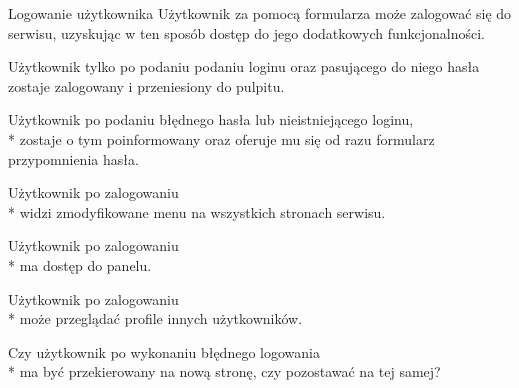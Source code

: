 \documentclass[a4paper]{article}
\begin{document}
    \begin{userstory}{Logowanie użytkownika}
        Użytkownik za pomocą formularza może zalogować się do serwisu,
        uzyskując w ten sposób dostęp do jego dodatkowych funkcjonalności.
        
        \begin{tests}
            \item{
                Użytkownik tylko po podaniu podaniu loginu oraz pasującego do niego hasła
                zostaje zalogowany i przeniesiony do pulpitu.
            }
            \item{
                Użytkownik po podaniu błędnego hasła lub nieistniejącego loginu,\\*
                zostaje o tym poinformowany oraz oferuje mu się od razu formularz przypomnienia hasła.
            }
            \item{
                Użytkownik po zalogowaniu\\*
                widzi zmodyfikowane menu na wszystkich stronach serwisu.
            }
            \item{
                Użytkownik po zalogowaniu\\*
                ma dostęp do panelu.
            }
            \item{
                Użytkownik po zalogowaniu\\*
                może przeglądać profile innych użytkowników.
            }
        \end{tests}
        \begin{questions}
            \item{
                Czy użytkownik po wykonaniu błędnego logowania\\*
                ma być przekierowany na nową stronę, czy pozostawać na tej samej?
            }
        \end{questions}
    \end{userstory}
\end{document}

